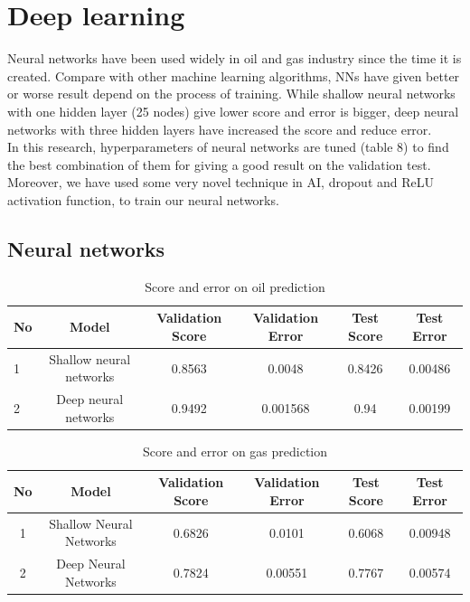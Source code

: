 \documentclass[12pt,a4paper]{report}
\begin{document}
\section{Deep learning}
Neural networks have been used widely in oil and gas industry since the time it is created. Compare with other machine learning algorithms, NNs have given better or worse result depend on the process of training. While shallow neural networks with one hidden layer (25 nodes) give lower score and error is bigger, deep neural networks with three hidden layers have increased the score and reduce error.\\
In this research, hyperparameters of neural networks are tuned (table 8) to find the best combination of them for giving a good result on the validation test. Moreover, we have used some very novel technique in AI, dropout and ReLU activation function, to train our neural networks. 
\subsection{Neural networks}
\begin{table}[H]
\caption{Score and error on oil prediction}
\centering
\begin{adjustbox}{width=1\textwidth}
\small
\begin{tabular}{|l|c|c|c|c|c|}
\hline
\textbf{No} & \textbf{Model}          & \textbf{Validation Score} & \textbf{Validation Error} & \textbf{Test Score} & \textbf{Test Error}  \\ \hline
1           & Shallow neural networks & 0.8563                        & 0.0048                    & 0.8426                  & 0.00486                                     \\ \hline
2           & Deep neural networks    & 0.9492                        & 0.001568                  & 0.94                    & 0.00199                                    \\ \hline
\end{tabular}
\end{adjustbox}
\end{table}

\begin{table}[H]
\caption{Score and error on gas prediction}
\centering
\begin{adjustbox}{width=1\textwidth}
\small
\begin{tabular}{|c|c|c|c|c|c|}
\hline
\textbf{No} & \textbf{Model}          & \textbf{Validation Score} & \textbf{Validation Error} & \textbf{Test Score} & \textbf{Test Error} \\ \hline
1           & Shallow Neural Networks & 0.6826                    & 0.0101                    & 0.6068              & 0.00948             \\ \hline
2           & Deep Neural Networks    & 0.7824                    & 0.00551                   & 0.7767              & 0.00574             \\ \hline
\end{tabular}
\end{adjustbox}
\end{table}
\end{document}

